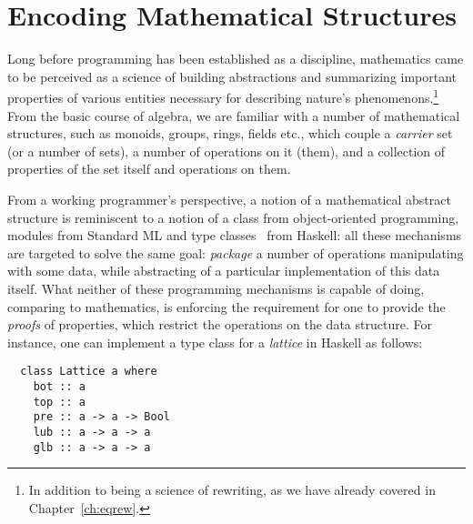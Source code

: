 \begin{coqdoccode}
\coqdocemptyline
\coqdocemptyline
\end{coqdoccode}



\chapter{Encoding Mathematical Structures}
\label{ch:depstruct}
 




Long before programming has been established as a discipline,
mathematics came to be perceived as a science of building
abstractions and summarizing important properties of various entities
necessary for describing nature's phenomenons.\footnote{In
addition to being a science of rewriting, as we have already covered
in Chapter~\ref{ch:eqrew}.} From the basic course of algebra, we are
familiar with a number of mathematical structures, such as monoids,
groups, rings, fields etc., which couple a \textit{carrier} set (or a number of
sets), a number of operations on it (them), and a collection of
properties of the set itself and operations on them.


From a working programmer's perspective, a notion of a mathematical
abstract structure is reminiscent to a notion of a class from
object-oriented programming, modules from Standard ML and type
classes~\cite{Wadler-Blott:POPL89} from Haskell: all these
mechanisms are targeted to solve the same goal: \textit{package} a number of
operations manipulating with some data, while abstracting of a
particular implementation of this data itself. What neither of these
programming mechanisms is capable of doing, comparing to mathematics,
is enforcing the requirement for one to provide the \textit{proofs} of
properties, which restrict the operations on the data structure. For
instance, one can implement a type class for a \textit{lattice} in Haskell as
follows: 


\begin{verbatim}
  class Lattice a where
    bot :: a
    top :: a
    pre :: a -> a -> Bool
    lub :: a -> a -> a
    glb :: a -> a -> a
\end{verbatim}


